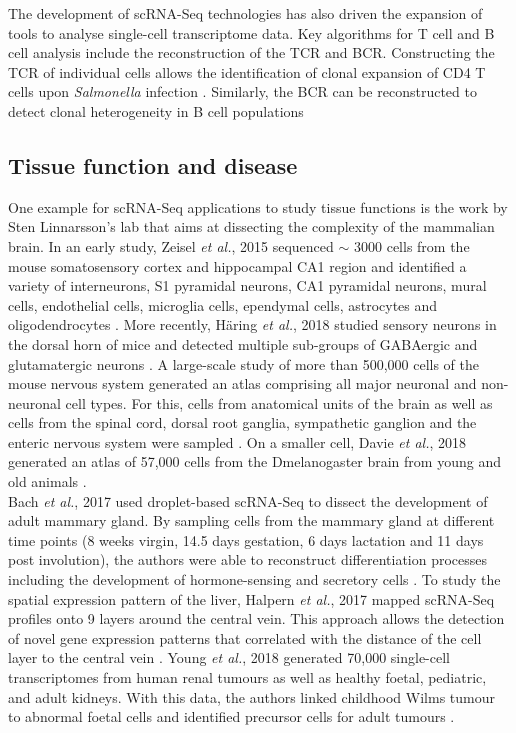 The development of scRNA-Seq technologies has also driven the expansion of tools to analyse single-cell transcriptome data. Key algorithms for T cell and B cell analysis include the reconstruction of the TCR and \gls{BCR}. Constructing the TCR of individual cells allows the identification of clonal expansion of CD4\plus{} T cells upon \textit{Salmonella} infection \citep{Stubbington2016}. Similarly, the BCR can be reconstructed to detect clonal heterogeneity in B cell populations \citep{Canzar2017, Wu2018}

\subsection{Tissue function and disease}

One example for scRNA-Seq applications to study tissue functions is the work by Sten Linnarsson's lab that aims at dissecting the complexity of the mammalian brain. In an early study, Zeisel \emph{et al.}, 2015 sequenced $\sim$ 3000 cells from the mouse somatosensory cortex and hippocampal \gls{CA}1 region and identified a variety of interneurons, S1 pyramidal neurons, CA1 pyramidal neurons, mural cells, endothelial cells, microglia cells, ependymal cells, astrocytes and oligodendrocytes \citep{Zeisel2015}. More recently, H\"a{}ring \emph{et al.}, 2018 studied sensory neurons in the dorsal horn of mice and detected multiple sub-groups of \gls{GABA}ergic and glutamatergic neurons \citep{Haring2018}. A large-scale study of more than 500,000 cells of the mouse nervous system generated an atlas comprising all major neuronal and non-neuronal cell types. For this, cells from anatomical units of the brain as well as cells from the spinal cord, dorsal root ganglia, sympathetic ganglion and the enteric nervous system were sampled \citep{Zeisel2018}. On a smaller cell, Davie \emph{et al.}, 2018 generated an atlas of 57,000 cells from the \gls{Dmelanogaster} brain from young and old animals \cite{Davie2018}.\\

Bach \emph{et al.}, 2017 used droplet-based scRNA-Seq to dissect the development of adult mammary gland. By sampling cells from the mammary gland at different time points (8 weeks virgin, 14.5 days gestation, 6 days lactation and 11 days post involution), the authors were able to reconstruct differentiation processes including the development of hormone-sensing and secretory cells \citep{Bach2017}. To study the spatial expression pattern of the liver, Halpern \emph{et al.}, 2017 mapped scRNA-Seq profiles onto 9 layers around the central vein. This approach allows the detection of novel gene expression patterns that correlated with the distance of the cell layer to the central vein \citep{Halpern2017}. Young \emph{et al.}, 2018 generated 70,000 single-cell transcriptomes from human renal tumours as well as healthy foetal, pediatric, and adult kidneys. With this data, the authors linked childhood Wilms tumour to abnormal foetal cells and identified precursor cells for adult tumours \citep{Young2018}. \\

